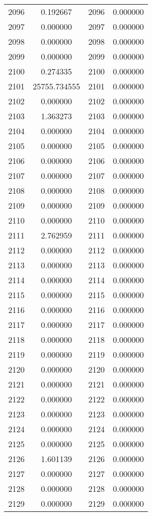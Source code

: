 \documentclass[12pt]{article}
\begin{document}
\begin{longtable}{@{}cccc@{}}
2096 & 0.192667 & 2096 & 0.000000 \\
2097 & 0.000000 & 2097 & 0.000000 \\
2098 & 0.000000 & 2098 & 0.000000 \\
2099 & 0.000000 & 2099 & 0.000000 \\
2100 & 0.274335 & 2100 & 0.000000 \\
2101 & 25755.734555 & 2101 & 0.000000 \\
2102 & 0.000000 & 2102 & 0.000000 \\
2103 & 1.363273 & 2103 & 0.000000 \\
2104 & 0.000000 & 2104 & 0.000000 \\
2105 & 0.000000 & 2105 & 0.000000 \\
2106 & 0.000000 & 2106 & 0.000000 \\
2107 & 0.000000 & 2107 & 0.000000 \\
2108 & 0.000000 & 2108 & 0.000000 \\
2109 & 0.000000 & 2109 & 0.000000 \\
2110 & 0.000000 & 2110 & 0.000000 \\
2111 & 2.762959 & 2111 & 0.000000 \\
2112 & 0.000000 & 2112 & 0.000000 \\
2113 & 0.000000 & 2113 & 0.000000 \\
2114 & 0.000000 & 2114 & 0.000000 \\
2115 & 0.000000 & 2115 & 0.000000 \\
2116 & 0.000000 & 2116 & 0.000000 \\
2117 & 0.000000 & 2117 & 0.000000 \\
2118 & 0.000000 & 2118 & 0.000000 \\
2119 & 0.000000 & 2119 & 0.000000 \\
2120 & 0.000000 & 2120 & 0.000000 \\
2121 & 0.000000 & 2121 & 0.000000 \\
2122 & 0.000000 & 2122 & 0.000000 \\
2123 & 0.000000 & 2123 & 0.000000 \\
2124 & 0.000000 & 2124 & 0.000000 \\
2125 & 0.000000 & 2125 & 0.000000 \\
2126 & 1.601139 & 2126 & 0.000000 \\
2127 & 0.000000 & 2127 & 0.000000 \\
2128 & 0.000000 & 2128 & 0.000000 \\
2129 & 0.000000 & 2129 & 0.000000 \\

\end{longtable}
\end{document}
